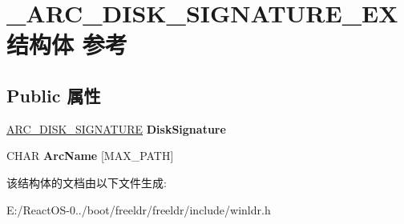 \hypertarget{struct___a_r_c___d_i_s_k___s_i_g_n_a_t_u_r_e___e_x}{}\section{\+\_\+\+A\+R\+C\+\_\+\+D\+I\+S\+K\+\_\+\+S\+I\+G\+N\+A\+T\+U\+R\+E\+\_\+\+E\+X结构体 参考}
\label{struct___a_r_c___d_i_s_k___s_i_g_n_a_t_u_r_e___e_x}
\subsection*{Public 属性}
\begin{DoxyCompactItemize}
\item 
\mbox{\label{struct___a_r_c___d_i_s_k___s_i_g_n_a_t_u_r_e___e_x_aa7328cd638c54692afa933c7d87e3324}} 
\hyperlink{struct___a_r_c___d_i_s_k___s_i_g_n_a_t_u_r_e}{A\+R\+C\+\_\+\+D\+I\+S\+K\+\_\+\+S\+I\+G\+N\+A\+T\+U\+RE} {\bfseries Disk\+Signature}
\item 
\mbox{\label{struct___a_r_c___d_i_s_k___s_i_g_n_a_t_u_r_e___e_x_a5f0db25a96fa05788af721dbcb637c70}} 
C\+H\+AR {\bfseries Arc\+Name} \mbox{[}M\+A\+X\+\_\+\+P\+A\+TH\mbox{]}
\end{DoxyCompactItemize}


该结构体的文档由以下文件生成\+:\begin{DoxyCompactItemize}
\item 
E\+:/\+React\+O\+S-\/0../boot/freeldr/freeldr/include/winldr.\+h\end{DoxyCompactItemize}
